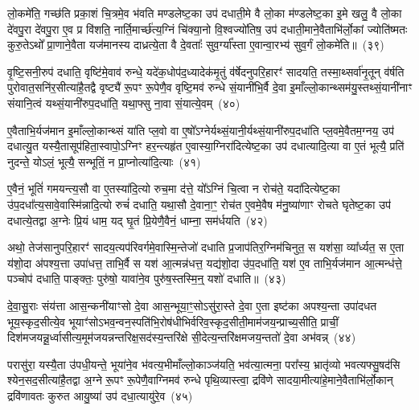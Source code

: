 लो॒कमे॑ति॒ गच्छ॑ति प्रका॒शं चि॒त्रमे॒व भ॑वति मण्डलेष्ट॒का उप॑ दधाती॒मे वै लो॒का म॑ण्डलेष्ट॒का इ॒मे खलु॒ वै लो॒का दे॑वपु॒रा दे॑वपु॒रा ए॒व प्र वि॑शति॒ नार्ति॒मार्च्छ॑त्य॒ग्निं चि॑क्या॒नो वि॒श्वज्यो॑तिष॒ उप॑ दधाती॒माने॒वैताभि॑र्लो॒कां ज्योति॑ष्मतः कुरु॒ते\-ऽथो᳚ प्रा॒णाने॒वैता यज॑मानस्य दाध्रत्ये॒ता वै दे॒वताः᳚ सुव॒र्ग्या᳚स्ता ए॒वान्वा॒रभ्य॑ सुव॒र्गं लो॒कमे॑ति॥~(३९)

{\anuvakamend[{सु॒व॒र्गमे॒व ता ए॒व च॒त्वारि॑ च}]}%

वृ॒ष्टि॒सनी॒रुप॑ दधाति॒ वृष्टि॑मे॒वाव॑ रुन्धे॒ यदे॑क॒धोप॑द॒ध्यादेक॑मृ॒तुं व॑र्\mbox{}षेदनुपरि॒हारꣳ॑ सादयति॒ तस्मा॒थ्सर्वा॑नृ॒तून् व॑र्\mbox{}षति पुरोवात॒सनि॑र॒सीत्या॑है॒तद्वै वृष्ट्यै॑ रू॒पꣳ रू॒पेणै॒व वृष्टि॒मव॑ रुन्धे सं॒यानी॑भि॒र्वै दे॒वा इ॒माँल्लो॒कान्थ्सम॑यु॒स्तथ्सं॒यानी॑नाꣳ संयानि॒त्वं यथ्सं॒यानी॑रुप॒दधा॑ति॒ यथा॒फ्सु ना॒वा सं॒यात्ये॒वम्~(४०)

ए॒वैताभि॒र्यज॑मान इ॒माँल्लो॒कान्थ्सं या॑ति प्ल॒वो वा ए॒षो᳚\-ऽग्नेर्यथ्सं॒यानी॒र्यथ्सं॒यानी॑रुप॒दधा॑ति प्ल॒वमे॒वैतम॒ग्नय॒ उप॑ दधात्यु॒त यस्यै॒तासूप॑हिता॒स्वापो॒\-ऽग्निꣳ हर॒न्त्यहृ॑त ए॒वास्या॒ग्निरा॑दित्येष्ट॒का उप॑ दधात्यादि॒त्या वा ए॒तं भूत्यै॒ प्रति॑ नुदन्ते॒ यो\-ऽलं॒ भूत्यै॒ सन्भूतिं॒ न प्रा॒प्नोत्या॑दि॒त्याः~(४१)

ए॒वैनं॒ भूतिं॑ गमयन्त्य॒सौ वा ए॒तस्या॑दि॒त्यो रुच॒मा द॑त्ते॒ यो᳚\-ऽग्निं चि॒त्वा न रोच॑ते॒ यदा॑दित्येष्ट॒का उ॑प॒दधा᳚त्य॒सावे॒वास्मि॑न्नादि॒त्यो रुचं॑ दधाति॒ यथा॒सौ दे॒वाना॒ꣳ॒ रोच॑त ए॒वमे॒वैष म॑नु॒ष्या॑णाꣳ रोचते घृतेष्ट॒का उप॑ दधात्ये॒तद्वा अ॒ग्नेः प्रि॒यं धाम॒ यद् घृ॒तं प्रि॒येणै॒वैनं॒ धाम्ना॒ सम॑र्धयति~(४२)

अथो॒ तेज॑सानुपरि॒हारꣳ॑ सादय॒त्यप॑रिवर्गमे॒वास्मि॒न्तेजो॑ दधाति प्र॒जा\-प॑तिर॒ग्निम॑चिनुत॒ स यश॑सा॒ व्या᳚र्ध्यत॒ स ए॒ता य॑शो॒दा अ॑पश्य॒त्ता उपा॑धत्त॒ ताभि॒र्वै स यश॑ आ॒त्मन्न॑धत्त॒ यद्य॑शो॒दा उ॑प॒दधा॑ति॒ यश॑ ए॒व ताभि॒र्यज॑मान आ॒त्मन्ध॑त्ते॒ पञ्चोप॑ दधाति॒ पाङ्क्तः॒ पुरु॑षो॒ यावा॑ने॒व पुरु॑ष॒स्तस्मि॒न्॒ यशो॑ दधाति॥~(४३)

{\anuvakamend[{ए॒वं प्रा॒प्नोत्या॑दि॒त्या अ॑र्धय॒त्येका॒न्नप॑ञ्चा॒शच्च॑}]}%

दे॒वा॒सु॒राः संय॑त्ता आस॒न्कनी॑याꣳसो दे॒वा आस॒न्भूया॒ꣳ॒सो\-ऽसु॑रा॒स्ते दे॒वा ए॒ता इष्ट॑का अपश्य॒न्ता उपा॑दधत भूय॒स्कृद॒सीत्ये॒व भूयाꣳ॑सो\-ऽभव॒न्वन॒स्पति॑भि॒रोष॑धीभिर्वरिव॒स्कृद॒सीती॒माम॑जय॒न्प्राच्य॒सीति॒ प्राचीं॒ दिश॑मजयन्नू॒र्ध्वासीत्य॒मूम॑जयन्नन्तरिक्ष॒सद॑स्य॒न्तरि॑क्षे सी॒देत्य॒न्तरि॑क्षमजय॒न्ततो॑ दे॒वा अभ॑वन्न्~(४४)

परासु॑रा॒ यस्यै॒ता उ॑पधी॒यन्ते॒ भूया॑ने॒व भ॑वत्य॒भीमाँल्लो॒काञ्ज॑यति॒ भव॑त्या॒त्मना॒ परा᳚स्य॒ भ्रातृ॑व्यो भवत्यफ्सु॒षद॑सि श्येन॒सद॒सीत्या॑है॒तद्वा अ॒ग्ने रू॒पꣳ रू॒पेणै॒वाग्निमव॑ रुन्धे पृथि॒व्यास्त्वा॒ द्रवि॑णे सादया॒मीत्या॑हे॒माने॒वैताभि॑र्लो॒कान् द्रवि॑णावतः कुरुत आयु॒ष्या॑ उप॑ दधा॒त्यायु॑रे॒व~(४५)

